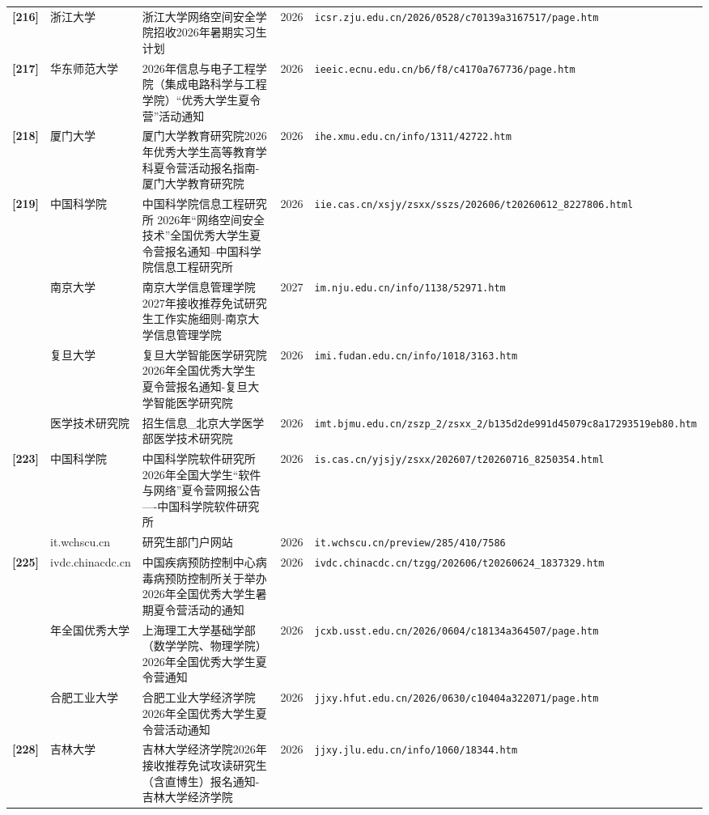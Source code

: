 {\begin{longtable}{@{}p{1.15cm}p{2.9cm}p{6.3cm}p{0.85cm}p{5.0cm}@{}}
\textbf{[216]} & 浙江大学 & 浙江大学网络空间安全学院招收2026年暑期实习生计划 & 2026 & \texttt{icsr.zju.edu.cn/2026/0528/c70139a3167517/page.htm} \\
\textbf{[217]} & 华东师范大学 & 2026年信息与电子工程学院（集成电路科学与工程学院）“优秀大学生夏令营”活动通知 & 2026 & \texttt{ieeic.ecnu.edu.cn/b6/f8/c4170a767736/page.htm} \\
\textbf{[218]} & 厦门大学 & 厦门大学教育研究院2026年优秀大学生高等教育学科夏令营活动报名指南-厦门大学教育研究院 & 2026 & \texttt{ihe.xmu.edu.cn/info/1311/42722.htm} \\
\textbf{[219]} & 中国科学院 & 中国科学院信息工程研究所 2026年“网络空间安全技术”全国优秀大学生夏令营报名通知--中国科学院信息工程研究所 & 2026 & \texttt{iie.cas.cn/xsjy/zsxx/sszs/202606/t20260612\_8227806.html} \\
[220] & 南京大学 & 南京大学信息管理学院2027年接收推荐免试研究生工作实施细则-南京大学信息管理学院 & 2027 & \texttt{im.nju.edu.cn/info/1138/52971.htm} \\
[221] & 复旦大学 & 复旦大学智能医学研究院2026年全国优秀大学生 夏令营报名通知-复旦大学智能医学研究院 & 2026 & \texttt{imi.fudan.edu.cn/info/1018/3163.htm} \\
[222] & 医学技术研究院 & 招生信息\_北京大学医学部\textbar{}医学技术研究院 & 2026 & \texttt{imt.bjmu.edu.cn/zszp\_2/zsxx\_2/b135d2de991d45079c8a17293519eb80.htm} \\
\textbf{[223]} & 中国科学院 & 中国科学院软件研究所2026年全国大学生“软件与网络”夏令营网报公告----中国科学院软件研究所 & 2026 & \texttt{is.cas.cn/yjsjy/zsxx/202607/t20260716\_8250354.html} \\
[224] & it.wchscu.cn & 研究生部门户网站 & 2026 & \texttt{it.wchscu.cn/preview/285/410/7586} \\
\textbf{[225]} & ivdc.chinacdc.cn & 中国疾病预防控制中心病毒病预防控制所关于举办2026年全国优秀大学生暑期夏令营活动的通知 & 2026 & \texttt{ivdc.chinacdc.cn/tzgg/202606/t20260624\_1837329.htm} \\
[226] & 年全国优秀大学 & 上海理工大学基础学部（数学学院、物理学院）2026年全国优秀大学生夏令营通知 & 2026 & \texttt{jcxb.usst.edu.cn/2026/0604/c18134a364507/page.htm} \\
[227] & 合肥工业大学 & 合肥工业大学经济学院2026年全国优秀大学生夏令营活动通知 & 2026 & \texttt{jjxy.hfut.edu.cn/2026/0630/c10404a322071/page.htm} \\
\textbf{[228]} & 吉林大学 & 吉林大学经济学院2026年接收推荐免试攻读研究生（含直博生）报名通知-吉林大学经济学院 & 2026 & \texttt{jjxy.jlu.edu.cn/info/1060/18344.htm} \\

\end{longtable}}
